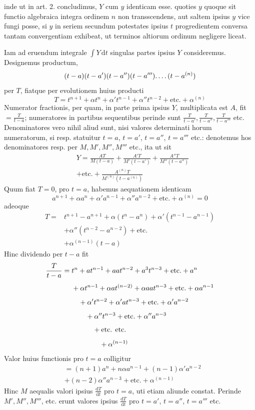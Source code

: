 inde ut in art. 2. concludimus, $Y$ cum $y$ identicam esse. quoties $y$ quoque sit
functio algebraica integra ordinem $n$ non transscendens, aut saltem ipsius $y$ vice
fungi posse, si $y$ in seriem secundum potestates ipsius $t$ progredientem conversa
tantam convergentiam exhibeat, ut terminos altiorum ordinum negligere liceat.

Iam ad eruendum integrale $\int Y\,\mathrm{d}t$ singulas partes ipsius $Y$ consideremus.
Designemus productum,
\[
(t-a)(t-a')(t-a'')(t-a''')\ldotp\ldotp\ldotp\ldotp(t-a^{(n)})
\]
per $T$, fiatque per evolutionem huius producti
\[
T=t^{n+1}+\alpha t^n+\alpha't^{n-1}+\alpha''t^{n-2}+\text{etc.}+\alpha^{(n)}
\]
Numerator fractionis, per quam, in parte prima ipsius $Y$, multiplicata est $A$, fit
$=\frac{T}{t-a}$; numeratores in partibus sequentibus perinde sunt
$\frac{T}{t-a'},\frac{T}{t-a''},\frac{T}{t-a'''}$ etc.
Denominatores vero nihil aliud sunt, nisi valores determinati horum numeratorum,
si resp. statuitur $t=a$, $t=a'$, $t=a''$, $t=a'''$ etc.: denotemus hos denominatores
resp. per $M,M',M'',M'''$ etc., ita ut sit
\[
\begin{aligned}&Y=\frac{AT}{M(t-a)}+\frac{A'T}{M'(t-a')}+\frac{A''T}{M''(t-a'')}\\ &+\text{etc.}+\frac{A^{(n)}T}{M^{(n)}(t-a^{(n)})}\end{aligned}
\]
Quum fiat $T=0$, pro $t=a$, habemus aequationem identicam
\[
a^{n+1}+\alpha a^n+\alpha'a^{n-1}+\alpha''a^{n-2}+\text{etc.}+\alpha^{(n)}=0
\]
adeoque
\[
\begin{aligned}
T={}&t^{n+1}-a^{n+1}+\alpha(t^n-a^n)+\alpha'(t^{n-1}-a^{n-1})
\\ &+\alpha''(t^{n-2}-a^{n-2})+\text{etc.}\\
&+\alpha^{(n-1)}(t-a)
\end{aligned}
\]
Hinc dividendo per $t-a$ fit
\[
\begin{aligned}
\frac{T}{t-a}={}&t^n+at^{n-1}+aat^{n-2}+a^3t^{n-3}+\text{etc.}+a^n\\[4pt]
&+\alpha t^{n-1}+\alpha at^{(n-2)}+\alpha aat^{n-3}+\text{etc.}+\alpha a^{n-1}\\[4pt]
&\hspace{1.01em}+\alpha't^{n-2}+\alpha'at^{n-3}+\text{etc.}+\alpha'a^{n-2}\\[4pt]
&\hspace{2.01em}+\alpha''t^{n-3}+\text{etc.}+\alpha''a^{n-3}\\[4pt]
&\hspace{3.01em}+\text{etc. etc.}\\[4pt]
&\hspace{4.01em}+\alpha^{(n-1)}
\end{aligned}
\]
Valor huius functionis pro $t=a$ colligitur
\[
\begin{aligned}&=(n+1)a^n+n\alpha a^{n-1}+(n-1)\alpha'a^{n-2}\\ &+(n-2)\alpha''a^{n-3}
+\text{etc.}+\alpha^{(n-1)}\end{aligned}
\]
Hinc $M$ aequalis valori ipsius $\frac{\mathrm{d}T}{\mathrm{d}t}$ pro $t=a$, uti etiam
aliunde constat. Perinde $M',M'',M'''$, etc. erunt valores ipsius
$\frac{\mathrm{d}T}{\mathrm{d}t}$ pro $t=a'$, $t=a''$, $t=a'''$ etc.

